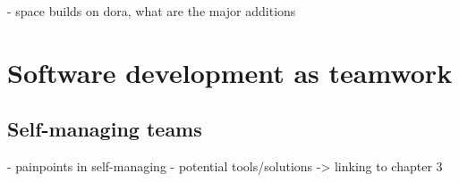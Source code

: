 
- space builds on dora, what are the major additions

\section{Software development as teamwork}

\subsection{Self-managing teams}
- painpoints in self-managing
- potential tools/solutions
-> linking to chapter 3

